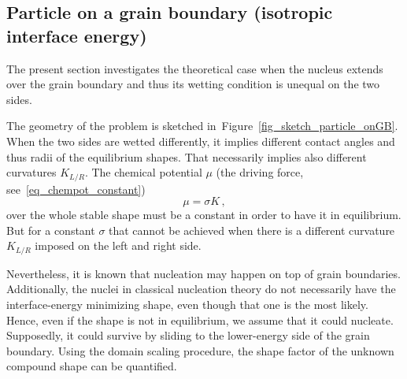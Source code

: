 \subsection{Particle on a grain boundary (isotropic interface energy)}
The present section investigates the theoretical case when the nucleus extends over the grain boundary and thus its wetting condition is unequal on the two sides. 

The geometry of the problem is sketched in~Figure~\ref{fig_sketch_particle_onGB}. When the two sides are wetted differently, it implies different contact angles and thus radii of the equilibrium shapes. That necessarily implies also different curvatures $K_{L/R}$. The chemical potential $\mu$ (the driving force, see~\eqref{eq_chempot_constant}) 
\begin{equation}
	\mu = \sigma K \,,
\end{equation}
over the whole stable shape must be a constant in order to have it in equilibrium. But for a constant $\sigma$ that cannot be achieved when there is a different curvature $K_{L/R}$ imposed on the left and right side.

Nevertheless, it is known that nucleation may happen on top of grain boundaries. Additionally, the nuclei in classical nucleation theory do not necessarily have the interface-energy minimizing shape, even though that one is the most likely. Hence, even if the shape is not in equilibrium, we assume that it could nucleate. Supposedly, it could survive by sliding to the lower-energy side of the grain boundary. Using the domain scaling procedure, the shape factor of the unknown compound shape can be quantified.

